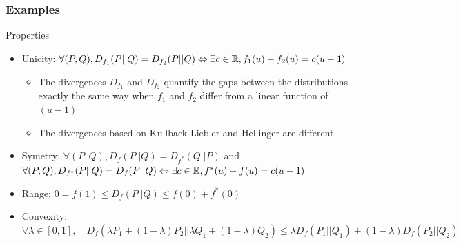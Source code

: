 \documentclass[8pt]{beamer}
\begin{document}
\begin{frame}
  \frametitle{Examples}
\begin{block}{Properties}
  \begin{itemize}
  \item Unicity: $\forall (P,Q), D_{f_1}(P||Q)=D_{f_2}(P||Q) \Leftrightarrow \exists c\in{\mathbb R}, f_1(u)-f_2(u)=c(u-1)$ 
  \begin{itemize}
  \item The divergences $D_{f_1}$ and $D_{f_2}$  quantify the gaps between the distributions  exactly the same way when  $f_1$ and $f_2$ differ from a linear function of $(u-1)$
  \item The divergences based on Kullback-Liebler and Hellinger are different
  \end{itemize}
  \item Symetry: $\forall (P,Q), D_{f}(P||Q)=D_{f^*}(Q||P)$ and $\forall (P,Q),D_{f^*}(P||Q)=D_{f}(P||Q)\Leftrightarrow \exists c\in{\mathbb R}, f^*(u)-f(u)=c(u-1)$
  \item Range: \alert{$\displaystyle 0=f(1)\leq D_f(P||Q)\leq f(0)+f^*(0)$}
  \item Convexity: $\displaystyle \forall \lambda\in[0,1],\quad D_f(\lambda P_1+(1-\lambda)P_2||\lambda Q_1+(1-\lambda)Q_2)\leq\lambda D_f(P_1||Q_1)+(1-\lambda)D_f(P_2||Q_2)$
  \end{itemize}
  \end{block}

  \end{frame}
\end{document}
